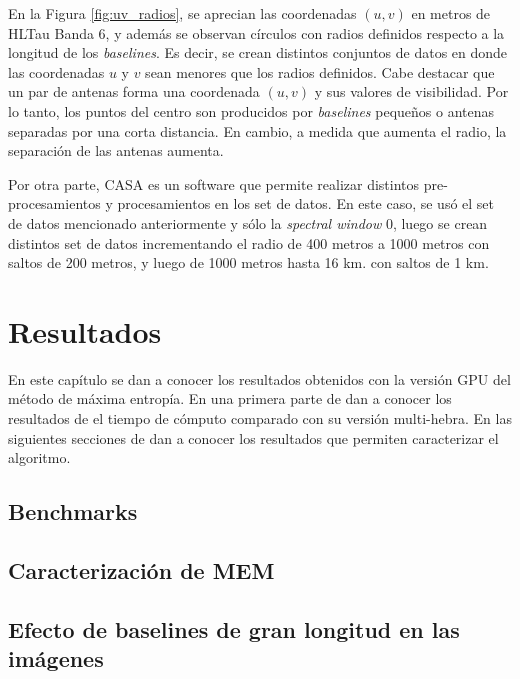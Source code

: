 En la Figura \ref{fig:uv_radios}, se aprecian las coordenadas $(u,v)$ en metros de HLTau Banda 6, y además se observan círculos con radios definidos respecto a la longitud de los \textit{baselines}. Es decir, se crean distintos conjuntos de datos en donde las coordenadas $u$ y $v$ sean menores que los radios definidos. Cabe destacar que un par de antenas forma una coordenada $(u,v)$ y sus valores de visibilidad. Por lo tanto, los puntos del centro son producidos por \textit{baselines} pequeños o antenas separadas por una corta distancia. En cambio, a medida que aumenta el radio, la separación de las antenas aumenta.

Por otra parte, CASA \citep{casa} es un software que permite realizar distintos pre-procesamientos y procesamientos en los set de datos. En este caso, se usó el set de datos mencionado anteriormente y sólo la \textit{spectral window} 0, luego se crean distintos set de datos incrementando el radio de 400 metros a 1000 metros con saltos de 200 metros, y luego de 1000 metros hasta 16 km. con saltos de 1 km.


\chapter{Resultados}
\label{cap:resultados}

En este capítulo se dan a conocer los resultados obtenidos con la versión GPU del método de máxima entropía. En una primera parte de dan a conocer los resultados de el tiempo de cómputo comparado con su versión multi-hebra. En las siguientes secciones de dan a conocer los resultados que permiten caracterizar el algoritmo.

\section{Benchmarks}
\section{Caracterización de MEM}
\section{Efecto de baselines de gran longitud en las imágenes}
